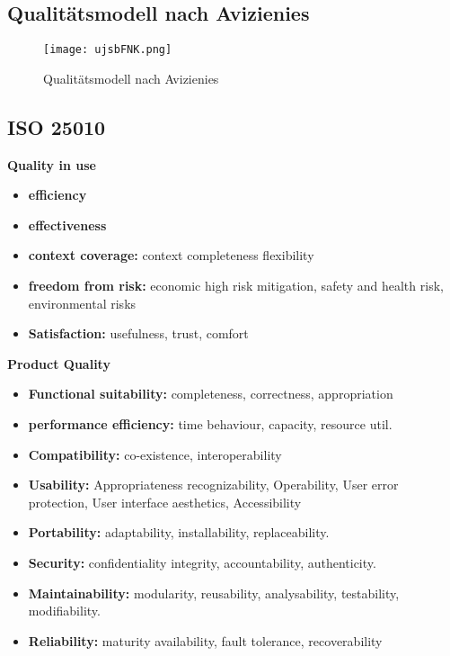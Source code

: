 \documentclass{book}
\begin{document}
    \subsection{Qualitätsmodell nach Avizienies}
    \begin{figure}[H]
        \centering
        \texttt{[image: ujsbFNK.png]}
        \caption{Qualitätsmodell nach Avizienies}
        \label{fig:enter-label}
    \end{figure}
    \subsection{ISO 25010}
    \textbf{Quality in use}
    \begin{itemize}
        \item \textbf{efficiency}
        \item \textbf{effectiveness}
        \item \textbf{context coverage:} context completeness flexibility
        \item \textbf{freedom from risk:} economic high risk mitigation, safety and health risk, environmental risks
        \item \textbf{Satisfaction:} usefulness, trust, comfort

    \end{itemize}
    \textbf{Product Quality}
    \begin{itemize}
        \item \textbf{Functional suitability:}
        completeness, correctness, appropriation
        \item \textbf{performance efficiency:} time behaviour, capacity, resource util.
        \item \textbf{Compatibility:} co-existence, interoperability
        \item \textbf{Usability:} Appropriateness
        recognizability,
        Operability,
        User error
        protection,
        User interface
        aesthetics, Accessibility
        \item \textbf{Portability:} adaptability, installability, replaceability.
        \item \textbf{Security:} confidentiality integrity, accountability, authenticity.
        \item \textbf{Maintainability:} modularity, reusability, analysability, testability, modifiability.
        \item \textbf{Reliability:} maturity availability, fault tolerance, recoverability
    \end{itemize}
\end{document}
